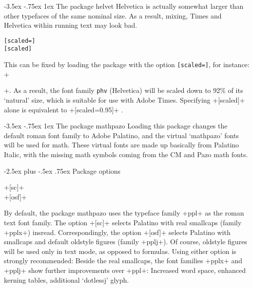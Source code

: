 \documentclass[11pt]{ltxguide}[1995/11/28]
\makeatletter
\renewcommand\section{\@startsection{section}{1}{\z@}%
{-3.5ex \@plus -.75ex}%
{1ex}%
{\normalfont\Large\bfseries}}
\renewcommand\subsection{\@startsection{subsection}{2}{\z@}%
{-2.5ex plus -.5ex}%
{.75ex}%
{\normalfont\large\bfseries}}
\newcommand{\Lpack}[1]{\textsf{#1}}
\makeatother
\begin{document}
\section{The package \Lpack{helvet}}
\label{sec:helvet}
Helvetica is actually somewhat larger than other typefaces
of the same nominal size.  
As a result, mixing, \eg Times and Helvetica within running text
may look bad.  
\begin{decl}
  \texttt{[scaled=}\texttt{]}\\
  \texttt{[scaled]}
\end{decl}
This can be fixed by loading the package with the option
\texttt{[scaled=}\texttt{]},
for instance:
+\usepackage[scaled=.92]{helvet}+.
As a result, the font family \texttt{phv} (Helvetica) will be 
scaled down to 92\% of its `natural' size, which is suitable
for use with Adobe Times.
Specifying +[scaled]+ alone is equivalent to +[scaled=0.95]+%
.



\section{The package \Lpack{mathpazo}}
\label{sec:mathpazo}
Loading
this package changes the default roman font family 
to Adobe Palatino, and the virtual `mathpazo' fonts will be used 
for math.
These virtual fonts are made up basically from Palatino Italic, with the
missing math symbols coming from the CM and Pazo math fonts.

\subsection{Package options}

\begin{decl}
  +[sc]+\\
  +[osf]+
\end{decl}
By default, the package \Lpack{mathpazo} uses
the typeface family +ppl+ as the roman text font family.
The option +[sc]+ selects Palatino with real smallcaps (family +pplx+) insread.
Correspondingly, the option +[osf]+ selects Palatino with smallcaps and default 
oldstyle figures (family +pplj+).  
Of course, oldstyle figures will be used only in text mode, as opposed to formulas.
Using either option is strongly recommended:
Beside the real smallcaps, the font families +pplx+ and +pplj+ show  further
improvements over +ppl+: Increased word space, enhanced kerning tables, 
additional `dotlessj' glyph. 
\end{document}
